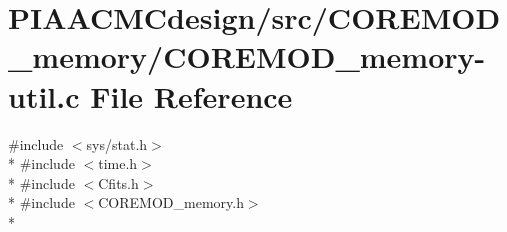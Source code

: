 \hypertarget{PIAACMCdesign_2src_2COREMOD__memory_2COREMOD__memory-util_8c}{\section{P\+I\+A\+A\+C\+M\+Cdesign/src/\+C\+O\+R\+E\+M\+O\+D\+\_\+memory/\+C\+O\+R\+E\+M\+O\+D\+\_\+memory-\/util.c File Reference}
\label{PIAACMCdesign_2src_2COREMOD__memory_2COREMOD__memory-util_8c}
}
{\ttfamily \#include $<$sys/stat.\+h$>$}\\*
{\ttfamily \#include $<$time.\+h$>$}\\*
{\ttfamily \#include $<$Cfits.\+h$>$}\\*
{\ttfamily \#include $<$C\+O\+R\+E\+M\+O\+D\+\_\+memory.\+h$>$}\\*
